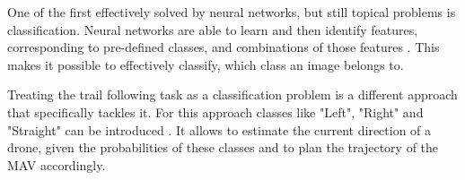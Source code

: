 One of the first effectively solved by neural networks, but still topical problems is classification. Neural networks are able to learn and then identify features, corresponding to pre-defined classes, and combinations of those features \cite{krizhevsky2012imagenet}. This makes it possible to effectively classify, which class an image belongs to. 

Treating the trail following task as a classification problem is a different approach that specifically tackles it. For this approach classes like "Left", "Right" and "Straight" can be introduced \cite{giusti2016machine}. It allows to estimate the current direction of a drone, given the probabilities of these classes and to plan the trajectory of the MAV accordingly. 


\begin{figure}[!h]
  \begin{minipage}{.5\linewidth}
  \centering
  \end{minipage}
  \begin{minipage}{.5\linewidth}
  \centering	
  


\end{minipage}
\end{figure}

